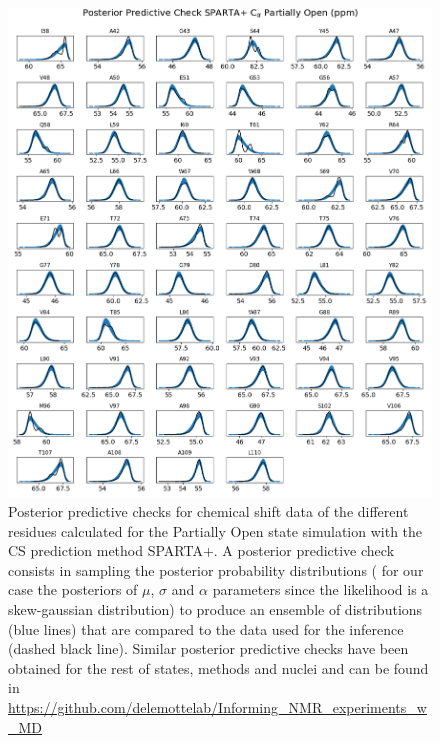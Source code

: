 \documentclass[%
 aip,
 amsmath,amssymb,
 preprint,%
]{revtex4-1}
\newcommand{\ca}{\ce{C_\alpha} }
\begin{document}
\begin{figure}[!htb]
	\includegraphics[width=\textwidth]{figures_SI/ppc_like_o_CA_sparta_plus.png}
	 \caption{\scriptsize
	 Posterior predictive checks for \ca chemical shift data of the different residues calculated for the Partially Open state simulation with the CS prediction method SPARTA+. A posterior predictive check consists in sampling the posterior probability distributions  ( for our case the posteriors of $\mu$, $\sigma$ and $\alpha$ parameters since the likelihood is a skew-gaussian distribution) to produce an ensemble of distributions (blue lines) that are compared to the data used for the inference (dashed black line). Similar posterior predictive checks have been obtained for the rest of states, methods and nuclei and can be found in \url{https://github.com/delemottelab/Informing_NMR_experiments_w_MD}
	 }
\label{SI_ppc}
\end{figure}
\end{document}
